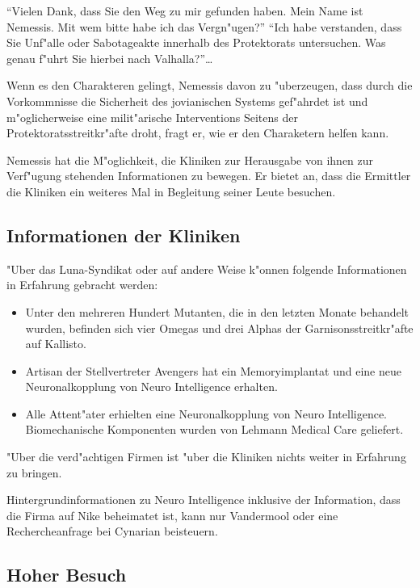 "`Vielen Dank, dass Sie den Weg zu mir gefunden haben. Mein Name ist Nemessis. Mit wem bitte habe ich das Vergn"ugen?"'
"`Ich habe verstanden, dass Sie Unf"alle oder Sabotageakte innerhalb des Protektorats untersuchen. Was genau f"uhrt Sie hierbei nach Valhalla?"'\dots

Wenn es den Charakteren gelingt, Nemessis davon zu "uberzeugen, dass durch die Vorkommnisse die Sicherheit des jovianischen Systems gef"ahrdet ist und m"oglicherweise eine milit"arische Interventions Seitens der Protektoratsstreitkr"afte droht, fragt er, wie er den Charaketern helfen kann.

\begin{remarks}
Nemessis hat die M"oglichkeit, die Kliniken zur Herausgabe von ihnen zur Verf"ugung stehenden Informationen zu bewegen. Er bietet an, dass die Ermittler die Kliniken ein weiteres Mal in Begleitung seiner Leute besuchen.
\end{remarks}

\subsection{Informationen der Kliniken}

"Uber das Luna-Syndikat oder auf andere Weise k"onnen folgende Informationen in Erfahrung gebracht werden:

\begin{itemize}
\item Unter den mehreren Hundert Mutanten, die in den letzten Monate behandelt wurden, befinden sich vier Omegas und drei Alphas der Garnisonsstreitkr"afte auf Kallisto.
\item Artisan der Stellvertreter Avengers hat ein Memoryimplantat und eine neue Neuronalkopplung von Neuro Intelligence erhalten.
\item Alle Attent"ater erhielten eine Neuronalkopplung von Neuro Intelligence. Biomechanische Komponenten wurden von Lehmann Medical Care geliefert.
\end{itemize}

"Uber die verd"achtigen Firmen ist "uber die Kliniken nichts weiter in Erfahrung zu bringen.

\begin{remarks}
Hintergrundinformationen zu Neuro Intelligence inklusive der Information, dass die Firma auf Nike beheimatet ist, kann nur Vandermool oder eine Rechercheanfrage bei Cynarian beisteuern.
\end{remarks}

\subsection{Hoher Besuch}

